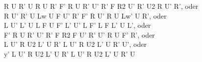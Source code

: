 R U R' U R U R' F' R U R' U' R' F R2 U' R' U2 R U' R', oder\\
R U' R' U Lw U F U' R' F' R U' R U Lw' U R', oder\\
L U' L' U L F U F' L' U' L F' L F L' U L', oder\\
F' R U R' U' R' F R2 F U' R' U' R U F' R', oder\\
L U' R U2 L' U R' L U' R U2 L' U R' U', oder\\
y' L U' R U2 L' U R' L U' R U2 L' U R' U\\
